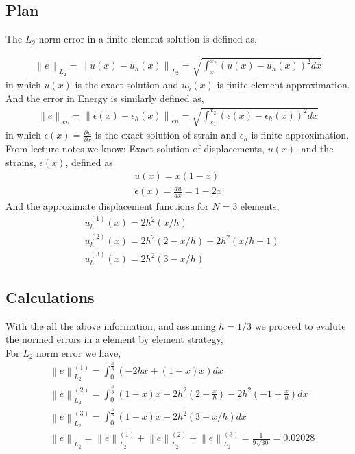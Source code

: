 \documentclass[a4paper]{memoir}
\begin{document}
\subsection{Plan}
The $L_2$ norm error in a finite element solution is defined as,

\begin{align}
		& \left\|e \right\|_{L_2} = \left\|u(x)-u_h(x) \right\|_{L_2} = \sqrt{ \int_{x_1}^{x_2} (u(x)-u_h(x))^2 dx }&
\end{align}
in which $u(x)$ is the exact solution and $u_h(x)$ is finite element approximation. \\
And the error in Energy is similarly defined as,
\begin{align}
		&\left\|e \right\|_{en} = \left\|\epsilon(x)-\epsilon_h(x) \right\|_{en} = \sqrt{ \int_{x_1}^{x_2} (\epsilon(x)-\epsilon_h(x))^2 dx }&
\end{align}
in which $\epsilon(x) = \frac{\partial u}{\partial x} $ is the exact solution of strain and $\epsilon_h$ is finite approximation. \\

From lecture notes we know: Exact solution of displacements, $u(x)$, and the strains, $\epsilon(x)$, defined as
\begin{align*}
	& u(x) = x(1-x)& \\
	& \epsilon(x) = \frac{du}{dx} = 1-2x& 
\end{align*}
And the approximate displacement functions for $N=3$ elements,
\begin{align*}
	& u^{(1)}_h(x) = 2h^2 (x/h) \\
	& u^{(2)}_h(x) = 2h^2 (2 - x/h) + 2h^2 (x/h - 1) \\
	& u^{(3)}_h(x) = 2h^2 (3 - x/h)
\end{align*}

\subsection{Calculations}
With the all the above information, and assuming $h=1/3$ we proceed to evalute the normed errors in a element by element strategy, \\
For $L_2$ norm error we have,
\begin{align*}
	& \left\|e \right\|_{L_2}^{(1)} = \int_{0}^{\frac{h}{3}} (-2 h x+(1-x) x) dx \\
	& \left\|e \right\|_{L_2}^{(2)} = \int_{0}^{\frac{h}{3}} (1-x) x-2 h^2 \left(2-\frac{x}{h}\right)-2 h^2 \left(-1+\frac{x}{h}\right) dx \\
	& \left\|e \right\|_{L_2}^{(3)} = \int_{0}^{\frac{h}{3}} (1 - x) x - 2 h^2 (3 - x/h) dx \\
	& \left\|e \right\|_{L_2} = \left\|e \right\|_{L_2}^{(1)} + \left\|e \right\|_{L_2}^{(2)} + \left\|e \right\|_{L_2}^{(3)} = \frac{1}{9\sqrt{30}} = 0.02028
\end{align*}
\end{document}

